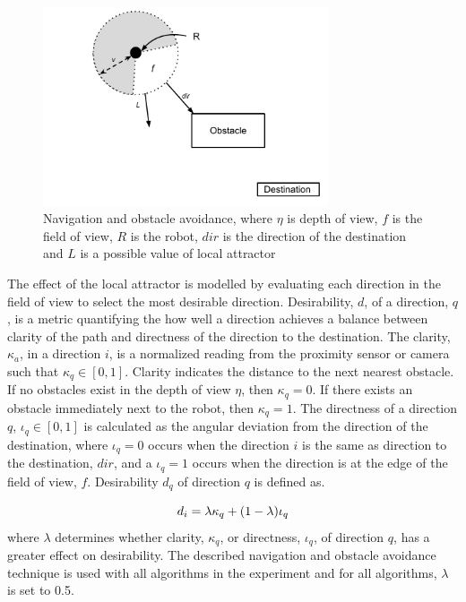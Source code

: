 \begin{figure}
	\centering
	\includegraphics[width=0.75\textwidth]{chapters/chapter5/figures/ObstacleAvoidance.pdf}
	\caption{Navigation and obstacle avoidance, where $\eta$ is depth of view, $f$ is the field of view, $R$ is the robot, $dir$ is the direction of the destination and $L$ is a possible value of local attractor}
	\label{fig:obstacleavoidance}
\end{figure}

The effect of the local attractor is modelled by evaluating each direction in the field of view to select the most desirable direction. Desirability, $d$, of a direction, $q$, is a metric quantifying the how well a direction achieves a balance between clarity of the path and directness of the direction to the destination. The clarity, $\kappa_a$, in a direction $i$, is a normalized reading from the proximity sensor or camera such that $\kappa_q\in[0,1]$. Clarity indicates the distance to the next nearest obstacle. If no obstacles exist in the depth of view $\eta$, then  $\kappa_q=0$. If there exists an obstacle immediately next to the robot, then $\kappa_q=1$. The directness of a direction $q$, $\iota_q\in[0,1]$ is calculated as the angular deviation from the direction of the destination, where $\iota_q=0$ occurs when the direction $i$ is the same as direction to the destination, $dir$, and a $\iota_q=1$ occurs when the direction is at the edge of the field of view, $f$. Desirability $d_q$ of direction $q$ is defined as.

\begin{equation}
	d_i= \lambda \kappa_q + (1 - \lambda)\iota_q \\
	\label{eq:1}
\end{equation} where $\lambda$ determines whether clarity, $\kappa_q$, or directness, $\iota_q$, of direction $q$, has a greater effect on desirability. The described navigation and obstacle avoidance technique is used with all algorithms in the experiment and for all algorithms, $\lambda$ is set to 0.5.




